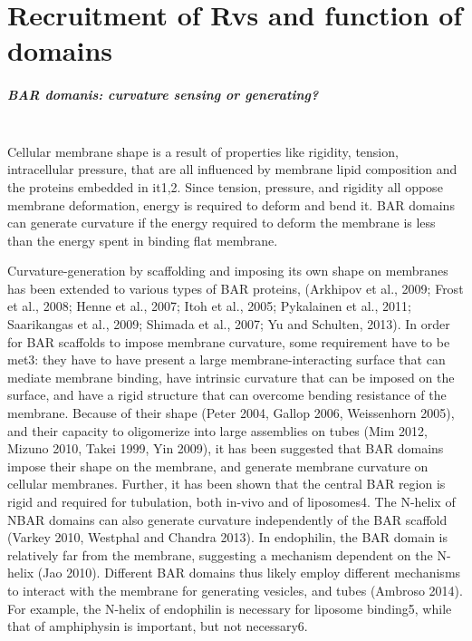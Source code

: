 \section{Recruitment of Rvs and function of domains} 

	\subparagraph{BAR domanis: curvature sensing or generating? }
	\mbox{}\\
	
	Cellular membrane shape is a result of properties like rigidity, tension, intracellular pressure, that are all influenced by membrane lipid composition and the proteins embedded in it1,2. Since tension, pressure, and rigidity all oppose membrane deformation, energy is required to deform and bend it. BAR domains can generate curvature if the energy required to deform the membrane is less than the energy spent in binding flat membrane.

	\vspace{5mm}
			
	Curvature-generation by scaffolding and imposing its own shape on membranes has been extended to various types of BAR proteins, (Arkhipov et al., 2009; Frost et al., 2008; Henne et al., 2007; Itoh et al., 2005; Pykalainen et al., 2011; Saarikangas et al., 2009; Shimada et al., 2007; Yu and Schulten, 2013). In order for BAR scaffolds to impose membrane curvature, some requirement have to be met3: they have to have present a large membrane-interacting surface that can mediate membrane binding, have intrinsic curvature that can be imposed on the surface, and have a rigid structure that can overcome bending resistance of the membrane. Because of their shape (Peter 2004, Gallop 2006, Weissenhorn 2005), and their capacity to oligomerize into large assemblies on tubes (Mim 2012, Mizuno 2010, Takei 1999, Yin 2009), it has been suggested that BAR domains impose their shape on the membrane, and generate membrane curvature on cellular membranes. Further, it has been shown that the central BAR region is rigid and required for tubulation, both in-vivo and of liposomes4. The N-helix of NBAR domains can also generate curvature independently of the BAR scaffold (Varkey 2010, Westphal and Chandra 2013). In endophilin, the BAR domain is relatively far from the membrane, suggesting a mechanism dependent on the N-helix (Jao 2010). Different BAR domains thus likely employ different mechanisms to interact with the membrane for generating vesicles, and tubes (Ambroso 2014). For example, the N-helix of endophilin is necessary for liposome binding5, while that of amphiphysin is important, but not necessary6. 


